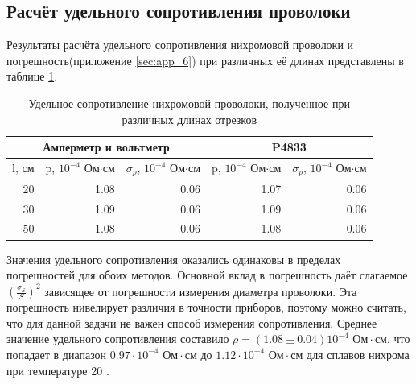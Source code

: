 \documentclass{article}
\begin{document}
\subsection{Расчёт удельного сопротивления проволоки}
Результаты расчёта удельного сопротивления нихромовой проволоки и погрешность(приложение \ref{sec:app_6}) при различных её длинах 
представлены в таблице \ref{tab:8}.
\begin{table}[H]
    \label{tab:8}
    \begin{center}
        \begin{tabular}{|r|r|r|r|r|}
            \hline
            \multicolumn{3}{|c|}{Амперметр и вольтметр} & 
            \multicolumn{2}{|c|}{P4833}                                                                                                                                               \\
            \hline
            l, см                                       & p, $10^{-4}$ Ом$\cdot$см & $\sigma_p$, $10^{-4}$ Ом$\cdot$см & p, $10^{-4}$ Ом$\cdot$см & $\sigma_p$, $10^{-4}$ Ом$\cdot$см \\
            \hline
            20                                          & 1.08                     & 0.06                              & 1.07                     & 0.06                              \\
            30                                          & 1.09                     & 0.06                              & 1.09                     & 0.06                              \\
            50                                          & 1.08                     & 0.06                              & 1.08                     & 0.06                              \\
            \hline
        \end{tabular}
    \end{center}
    \caption{Удельное сопротивление нихромовой проволоки, полученное при различных длинах отрезков}
\end{table}

Значения удельного сопротивления оказались одинаковы в пределах погрешностей для обоих методов. Основной вклад в погрешность даёт слагаемое $(\frac{\sigma_S}{S})^2$
зависящее от погрешности измерения диаметра проволоки. Эта погрешность нивелирует различия в точности приборов, поэтому
можно считать, что для данной задачи не важен способ измерения сопротивления.
Среднее значение удельного сопротивления составило $\overline{\rho} = (1.08 \pm 0.04) 10^{-4}\textrm{ Ом}\cdot\textrm{см}$, что попадает в диапазон
$0.97\cdot10^{-4}\textrm{ Ом}\cdot\textrm{см}$ до $1.12\cdot10^{-4}\textrm{ Ом}\cdot\textrm{см}$ для сплавов нихрома при температуре
20 \textcelsius \cite{ValuesBook}.
\end{document}
